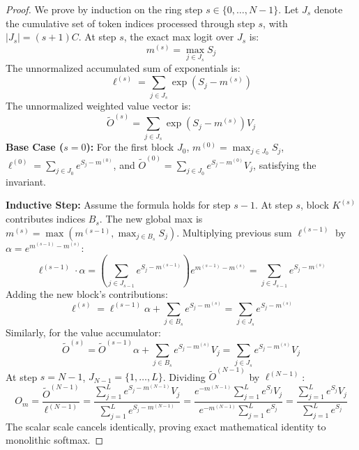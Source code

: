 \documentclass[11pt,a4paper]{article}
\theoremstyle{definition}
\begin{document}
\begin{proof}
We prove by induction on the ring step $s \in \{0, \dots, N-1\}$.
Let $J_s$ denote the cumulative set of token indices processed through step $s$, with $|J_s| = (s + 1) C$.
At step $s$, the exact max logit over $J_s$ is:
{\boldmath
\begin{equation}
m^{(s)} = \max_{j \in J_s} S_j
\end{equation}
}
The unnormalized accumulated sum of exponentials is:
{\boldmath
\begin{equation}
\ell^{(s)} = \sum_{j \in J_s} \exp\left( S_j - m^{(s)} \right)
\end{equation}
}
The unnormalized weighted value vector is:
{\boldmath
\begin{equation}
\tilde{O}^{(s)} = \sum_{j \in J_s} \exp\left( S_j - m^{(s)} \right) V_j
\end{equation}
}
\textbf{Base Case ($s = 0$):}
For the first block $J_0$, $m^{(0)} = \max_{j \in J_0} S_j$, $\ell^{(0)} = \sum_{j \in J_0} e^{S_j - m^{(0)}}$, and $\tilde{O}^{(0)} = \sum_{j \in J_0} e^{S_j - m^{(0)}} V_j$, satisfying the invariant.

\textbf{Inductive Step:}
Assume the formula holds for step $s - 1$.
At step $s$, block $K^{(s)}$ contributes indices $B_s$.
The new global max is $m^{(s)} = \max(m^{(s-1)}, \max_{j \in B_s} S_j)$.
Multiplying previous sum $\ell^{(s-1)}$ by $\alpha = e^{m^{(s-1)} - m^{(s)}}$:
{\boldmath
\begin{equation}
\ell^{(s-1)} \cdot \alpha = \left( \sum_{j \in J_{s-1}} e^{S_j - m^{(s-1)}} \right) e^{m^{(s-1)} - m^{(s)}} = \sum_{j \in J_{s-1}} e^{S_j - m^{(s)}}
\end{equation}
}
Adding the new block's contributions:
{\boldmath
\begin{equation}
\ell^{(s)} = \ell^{(s-1)} \alpha + \sum_{j \in B_s} e^{S_j - m^{(s)}} = \sum_{j \in J_s} e^{S_j - m^{(s)}}
\end{equation}
}
Similarly, for the value accumulator:
{\boldmath
\begin{equation}
\tilde{O}^{(s)} = \tilde{O}^{(s-1)} \alpha + \sum_{j \in B_s} e^{S_j - m^{(s)}} V_j = \sum_{j \in J_s} e^{S_j - m^{(s)}} V_j
\end{equation}
}
At step $s = N - 1$, $J_{N-1} = \{1, \dots, L\}$. Dividing $\tilde{O}^{(N-1)}$ by $\ell^{(N-1)}$:
{\boldmath
\begin{equation}
O_m = \frac{\tilde{O}^{(N-1)}}{\ell^{(N-1)}} = \frac{\sum_{j=1}^L e^{S_j - m^{(N-1)}} V_j}{\sum_{j=1}^L e^{S_j - m^{(N-1)}}} = \frac{e^{-m^{(N-1)}} \sum_{j=1}^L e^{S_j} V_j}{e^{-m^{(N-1)}} \sum_{j=1}^L e^{S_j}} = \frac{\sum_{j=1}^L e^{S_j} V_j}{\sum_{j=1}^L e^{S_j}}
\end{equation}
}
The scalar scale cancels identically, proving exact mathematical identity to monolithic softmax.
\end{proof}
\end{document}

